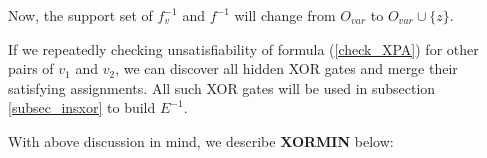 \documentclass[journal]{IEEEtran}
\begin{document}
Now,
the support set of $f^{-1}_v$ and $f^{-1}$ will change from $O_{var}$ to $O_{var}\cup \{z\}$.

If we repeatedly checking unsatisfiability of formula (\ref{check_XPA}) for other pairs of $v_1$ and $v_2$, 
we can discover all hidden XOR gates and merge their satisfying assignments.
All such XOR gates will be used in subsection \ref{subsec_insxor} to build $E^{-1}$.

%

With above discussion in mind, we describe \textbf{XORMIN} below:

\vspace{0.2cm}
\end{document}
